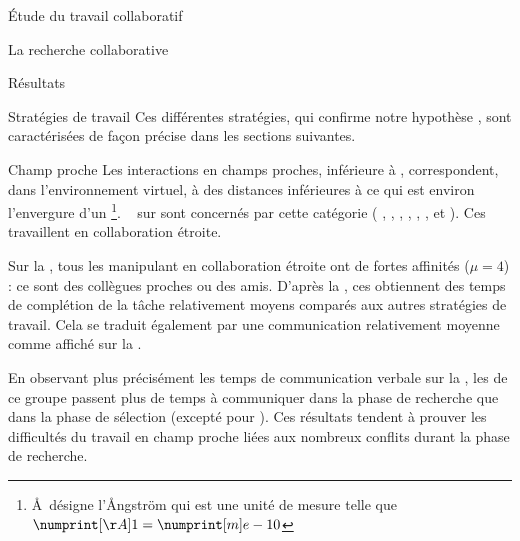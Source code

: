 \documentclass[myfrancais]{mythesis}
\begin{document}
\begin{mypart}{Étude du travail collaboratif}
\begin{mychapter}{La recherche collaborative}
\begin{mysection}{Résultats}
\begin{mysubsection}{Stratégies de travail}
					Ces différentes stratégies, qui confirme notre hypothèse , sont caractérisées de façon précise dans les sections suivantes.

					\begin{mysubsubsection}{Champ proche}
						Les interactions en champs proches, inférieure à , correspondent, dans l'environnement virtuel, à des distances inférieures à  ce qui est environ l'envergure d'un \footnote{\AA\ désigne l'\AA ngström qui est une unité de mesure telle que $\mynum[\AA]{1} = \mynum[m]{e-10}$}.
						~ sur  sont concernés par cette catégorie ( , , , , , ,  et ).
						Ces  travaillent en collaboration étroite.

						Sur la , tous les  manipulant en collaboration étroite ont de fortes affinités ($\mu = 4$) : ce sont des collègues proches ou des amis.
						D'après la , ces  obtiennent des temps de complétion de la tâche relativement moyens comparés aux autres stratégies de travail.
						Cela se traduit également par une communication relativement moyenne comme affiché sur la .

						En observant plus précisément les temps de communication verbale sur la , les  de ce groupe passent plus de temps à communiquer dans la phase de recherche que dans la phase de sélection (excepté pour ).
						Ces résultats tendent à prouver les difficultés du travail en champ proche liées aux nombreux conflits durant la phase de recherche.


\end{mysubsubsection}
\end{mysubsection}
\end{mysection}
\end{mychapter}
\end{mypart}
\end{document}

